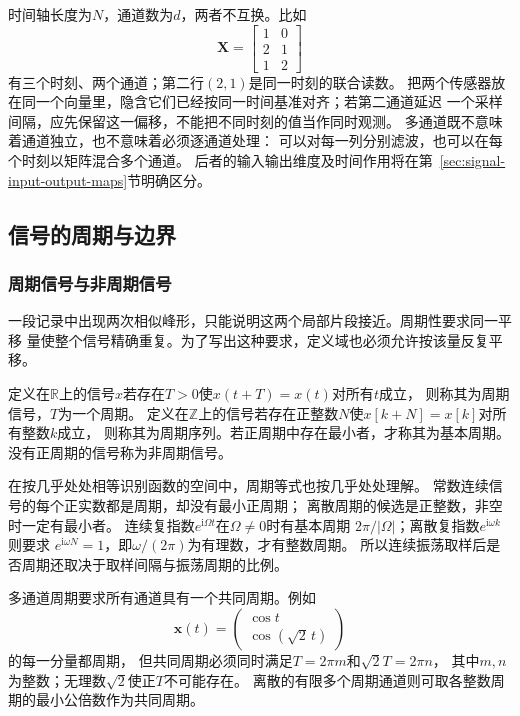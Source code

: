 时间轴长度为$N$，通道数为$d$，两者不互换。比如
\begin{equation}
  \bm X=
  \begin{bmatrix}1&0\\2&1\\1&2\end{bmatrix}
  \label{eq:signal-multichannel-record}
\end{equation}
有三个时刻、两个通道；第二行$(2,1)$是同一时刻的联合读数。
把两个传感器放在同一个向量里，隐含它们已经按同一时间基准对齐；若第二通道延迟
一个采样间隔，应先保留这一偏移，不能把不同时刻的值当作同时观测。
多通道既不意味着通道独立，也不意味着必须逐通道处理：
可以对每一列分别滤波，也可以在每个时刻以矩阵混合多个通道。
后者的输入输出维度及时间作用将在第~\ref{sec:signal-input-output-maps}节明确区分。

\subsection{信号的周期与边界}

\subsubsection{周期信号与非周期信号}

一段记录中出现两次相似峰形，只能说明这两个局部片段接近。周期性要求同一平移
量使整个信号精确重复。为了写出这种要求，定义域也必须允许按该量反复平移。
\begin{definition}[周期及基本周期]
  \label{def:signal-period}
  定义在$\mathbb R$上的信号$x$若存在$T>0$使$x(t+T)=x(t)$对所有$t$成立，
  则称其为周期信号，$T$为一个周期。
  定义在$\mathbb Z$上的信号若存在正整数$N$使$x[k+N]=x[k]$对所有整数$k$成立，
  则称其为周期序列。若正周期中存在最小者，才称其为基本周期。
  没有正周期的信号称为非周期信号。
\end{definition}

在按几乎处处相等识别函数的空间中，周期等式也按几乎处处理解。
常数连续信号的每个正实数都是周期，却没有最小正周期；
离散周期的候选是正整数，非空时一定有最小者。
连续复指数$e^{\mathrm i\Omega t}$在$\Omega\neq0$时有基本周期
$2\pi/|\Omega|$；离散复指数$e^{\mathrm i\omega k}$则要求
$e^{\mathrm i\omega N}=1$，即$\omega/(2\pi)$为有理数，才有整数周期。
所以连续振荡取样后是否周期还取决于取样间隔与振荡周期的比例。

多通道周期要求所有通道具有一个共同周期。例如
\[
  \bm x(t)=\begin{pmatrix}\cos t\\\cos(\sqrt2\,t)\end{pmatrix}
\]
的每一分量都周期，
但共同周期必须同时满足$T=2\pi m$和$\sqrt2 T=2\pi n$，
其中$m,n$为整数；无理数$\sqrt2$使正$T$不可能存在。
离散的有限多个周期通道则可取各整数周期的最小公倍数作为共同周期。

